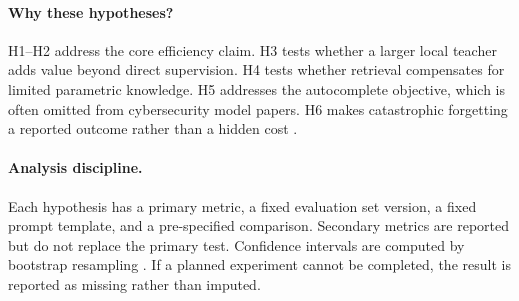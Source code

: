 \paragraph{Why these hypotheses?}
H1--H2 address the core efficiency claim. H3 tests whether a larger local
teacher adds value beyond direct supervision. H4 tests whether retrieval
compensates for limited parametric knowledge. H5 addresses the autocomplete
objective, which is often omitted from cybersecurity model papers. H6 makes
catastrophic forgetting a reported outcome rather than a hidden cost
\citep{kirkpatrick2017}.

\paragraph{Analysis discipline.}
Each hypothesis has a primary metric, a fixed evaluation set version, a fixed
prompt template, and a pre-specified comparison. Secondary metrics are reported
but do not replace the primary test. Confidence intervals are computed by
bootstrap resampling \citep{efron1979bootstrap}. If a planned experiment cannot
be completed, the result is reported as missing rather than imputed.
